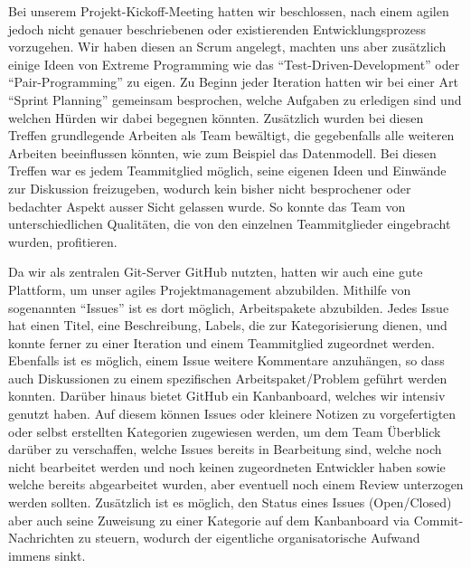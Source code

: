 \documentclass[12pt,DIV14,BCOR10mm,a4paper,parskip=half-,headsepline,headinclude,english,ngerman,bibliography=totocnumbered]{scrreprt}
\begin{document}
Bei unserem Projekt-Kickoff-Meeting hatten wir beschlossen, nach einem agilen jedoch nicht genauer beschriebenen oder existierenden Entwicklungsprozess vorzugehen. Wir haben diesen an Scrum angelegt, machten uns aber zusätzlich einige Ideen von Extreme Programming wie das \enquote{Test-Driven-Development} oder \enquote{Pair-Programming} zu eigen.
Zu Beginn jeder Iteration hatten wir bei einer Art \enquote{Sprint Planning} gemeinsam besprochen, welche Aufgaben zu erledigen sind und welchen Hürden wir dabei begegnen könnten. Zusätzlich wurden bei diesen Treffen grundlegende Arbeiten als Team bewältigt, die gegebenfalls alle weiteren Arbeiten beeinflussen könnten, wie zum Beispiel das Datenmodell.
Bei diesen Treffen war es jedem Teammitglied möglich, seine eigenen Ideen und Einwände zur Diskussion freizugeben, wodurch kein bisher nicht besprochener oder bedachter Aspekt ausser Sicht gelassen wurde. So konnte das Team von unterschiedlichen Qualitäten, die von den einzelnen Teammitglieder eingebracht wurden, profitieren.

Da wir als zentralen Git-Server GitHub nutzten, hatten wir auch eine gute Plattform, um unser agiles Projektmanagement abzubilden.
Mithilfe von sogenannten \enquote{Issues} ist es dort möglich, Arbeitspakete abzubilden.
Jedes Issue hat einen Titel, eine Beschreibung, Labels, die zur Kategorisierung dienen, und konnte ferner zu einer Iteration und einem Teammitglied zugeordnet werden.
Ebenfalls ist es möglich, einem Issue weitere Kommentare anzuhängen, so dass auch Diskussionen zu einem spezifischen Arbeitspaket/Problem geführt werden konnten.
Darüber hinaus bietet GitHub ein Kanbanboard, welches wir intensiv genutzt haben.
Auf diesem können Issues oder kleinere Notizen zu vorgefertigten oder selbst erstellten Kategorien zugewiesen werden, um dem Team Überblick darüber zu verschaffen, welche Issues bereits in Bearbeitung sind, welche noch nicht bearbeitet werden und noch keinen zugeordneten Entwickler haben sowie welche bereits abgearbeitet wurden, aber eventuell noch einem Review unterzogen werden sollten.
Zusätzlich ist es möglich, den Status eines Issues (Open/Closed) aber auch seine Zuweisung zu einer Kategorie auf dem Kanbanboard via Commit-Nachrichten zu steuern, wodurch der eigentliche organisatorische Aufwand immens sinkt.
\end{document}
